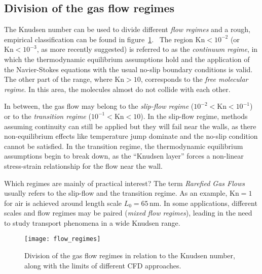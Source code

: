 \subsection{Division of the gas flow regimes}
The Knudsen number can be used to divide different \textit{flow regimes} and a
rough, empirical classification can be found in figure~\ref{fig:flow_regimes}.~\cite{Zhang2012} 
The region $\mathrm{Kn}<10^{-2}$ (or $\mathrm{Kn}<10^{-3}$, as more recently suggested)
is referred to as the \textit{continuum regime}, in which the thermodynamic equilibrium
assumptions hold and the application of the Navier-Stokes equations with the usual
no-slip boundary conditions is valid.
The other part of the range, where $\mathrm{Kn}>10$, corresponds to the
\textit{free molecular regime}. In this area, the molecules almost do not collide
with each other.

In between, the gas flow may belong to the \textit{slip-flow regime}
($10^{-2} < \mathrm{Kn} < 10^{-1} $) or to the \textit{transition regime}
($10^{-1} < \mathrm{Kn} < 10 $). In the slip-flow regime, methods assuming 
continuity can still be applied but they will fail near the walls, as there
non-equilibrium effects like temperature jump dominate and the no-slip condition
cannot be satisfied. In the transition regime, the thermodynamic equilibrium
assumptions begin to break down, as the ``Knudsen layer'' forces
a non-linear stress-strain relationship for the flow near the wall.

Which regimes are mainly of practical interest? The term \textit{Rarefied Gas Flows} 
usually refers to the slip-flow and the
transition regime. As an example, $\mathrm{Kn}=1$ for air 
is achieved around length scale $L_0 = 65\,\mathrm{nm}$.
In some applications, different scales and flow regimes may be paired (\textit{mixed flow regimes}),
leading in the need to study transport phenomena in a wide Knudsen range.~\cite{Karniadakis_Microflows}

\begin{figure}[h!]%
 	\begin{center}%
 		\texttt{[image: flow\_regimes]}%
 		\caption{Division of the gas flow regimes in relation to the Knudsen 
 		number, along with the limits of different CFD 
 		approaches.~\cite{Zhang2012}}\label{fig:flow_regimes}%
 	\end{center}%
\end{figure}